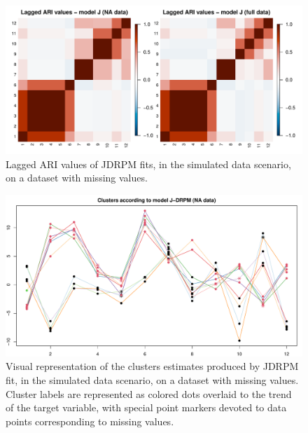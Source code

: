 \documentclass[12pt,	%
	a4paper,		%
	twoside,		%
	openright,		%
	titlepage,%
	]{book}
\theoremstyle{definition}
\begin{document}
\begin{figure}[!ht]
    \centering
    \includegraphics[width=1\linewidth]{Testing/NA data/no space NA/ari.pdf}
    \caption[Lagged ARI values of JDRPM, simulated data scenario, dataset with missing values]{Lagged ARI values of JDRPM fits, in the simulated data scenario, on a dataset with missing values.}
    \label{fig:ari no space NA}
\end{figure}

\begin{figure}[!ht]
    \centering
    \includegraphics[width=1\linewidth]{Testing/NA data/no space NA/clusters_J.pdf}
    \caption[Visual representation of the clusters estimates of JDRPM, simulated data scenario, dataset with missing values]{Visual representation of the clusters estimates produced by JDRPM fit, in the simulated data scenario, on a dataset with missing values. Cluster labels are represented as colored dots overlaid to the trend of the target variable, with special point markers devoted to data points corresponding to missing values.}
    \label{fig:clusters no space NA}
\end{figure}
\end{document}
